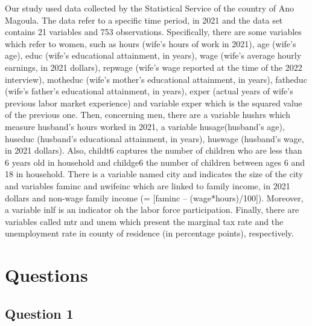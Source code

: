 \documentclass{article}
\begin{document}
	Our study used data collected by the Statistical Service of the country of Ano Magoula. The data refer to a specific time period, in 2021 and the data set contains 21 variables and 753 observations. Specifically, there are some variables which refer to women, such as hours (wife's hours of work in 2021), age (wife's age), educ (wife's educational attainment, in years), wage (wife's average hourly earnings, in 2021 dollars), repwage (wife's wage reported at the time of the 2022 interview), motheduc (wife's mother's educational attainment, in years), fatheduc (wife's father's educational attainment, in years), exper (actual years of wife's previous labor market experience) and variable exper which is the squared value of the previous one. Then, concerning men, there are a variable hushrs which measure husband's hours worked in 2021, a variable husage(husband's age), huseduc (husband's educational attainment, in years), huswage (husband's wage, in 2021 dollars). Also, childt6 captures the number of children who are less than 6 years old in household and childge6 the number of children between ages 6 and 18 in household. There is a variable named city and indicates the size of the city and variables faminc and nwifeinc which are linked to family income, in 2021 dollars and non-wage family income (= [faminc – (wage*hours)/100]). Moreover, a variable inlf is an indicator oh the labor force participation. Finally, there are variables called mtr and unem which present the marginal tax rate and the unemployment rate in county of residence (in percentage points), respectively.
	
	\vspace {0.5\baselineskip}
	
\section{Questions}
	
	\subsection{Question 1}
	
	\vspace {0.5\baselineskip}
	
\end{document}
